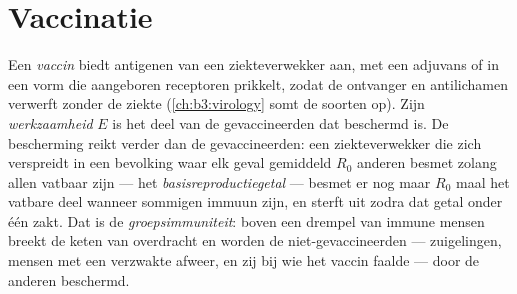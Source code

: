 \section{Vaccinatie}

\begin{definition}\label{def:b3:adaptive-immunity:vaccine}
Een \emph{vaccin} biedt antigenen van een ziekteverwekker aan, met een
adjuvans of in een vorm die aangeboren receptoren prikkelt, zodat de
ontvanger  en antilichamen verwerft zonder de ziekte
(\cref{ch:b3:virology} somt de soorten op). Zijn \emph{werkzaamheid}
$E$ is het deel van de gevaccineerden dat beschermd is. De bescherming
reikt verder dan de gevaccineerden: een ziekteverwekker die zich
verspreidt in een bevolking waar elk geval gemiddeld $R_{0}$ anderen
besmet zolang allen vatbaar zijn --- het \emph{basisreproductiegetal}
--- besmet er nog maar $R_{0}$ maal het vatbare deel wanneer sommigen
immuun zijn, en sterft uit zodra dat getal onder één zakt. Dat is de
\emph{groepsimmuniteit}: boven een drempel van immune mensen breekt de
keten van overdracht en worden de niet-gevaccineerden --- zuigelingen,
mensen met een verzwakte afweer, en zij bij wie het vaccin faalde ---
door de anderen beschermd.
\end{definition}


